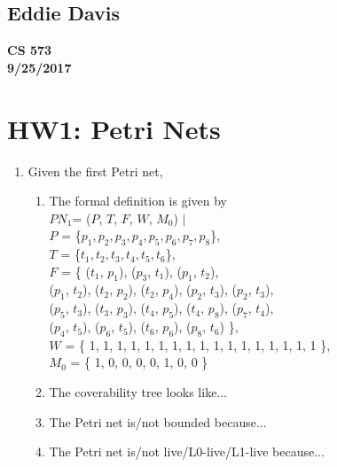 \documentclass{bsu-ms}
\begin{document}
\subsection*{Eddie Davis}
\textbf{CS 573}\\
\textbf{9/25/2017}\\

\section*{HW1: Petri Nets}

\begin{enumerate}
	\item Given the first Petri net,
	\begin{enumerate}[label=(\alph*)]
		\item The formal definition is given by \\
		$PN_1$= ($P$, $T$, $F$, $W$, $M_0$) $\mid$ \\
		$P$ = \{$p_1, p_2, p_3, p_4, p_5, p_6, p_7, p_8$\}, \\
		$T$ = \{$t_1, t_2, t_3, t_4, t_5, t_6$\}, \\
		$F$ = \{ ($t_1$, $p_1$), ($p_3$, $t_1$), ($p_1$, $t_2$), \\
		($p_1$, $t_2$), ($t_2$, $p_2$), ($t_2$, $p_4$),
		($p_2$, $t_3$), ($p_2$, $t_3$), \\
		($p_5$, $t_3$), ($t_3$, $p_3$), ($t_4$, $p_5$),
		($t_4$, $p_8$), ($p_7$, $t_4$), \\ ($p_4$, $t_5$),
		($p_6$, $t_5$), ($t_6$, $p_6$), ($p_8$, $t_6$)
		 \}, \\
   	    $W$ = \{ 1, 1, 1, 1, 1, 1, 1, 1, 1, 1, 1, 1, 1, 1, 1, 1, 1 \}, \\
        $M_0$ = \{ 1, 0, 0, 0, 0, 1, 0, 0 \}
		\item The coverability tree looks like...
		\item The Petri net is/not bounded because...
		\item The Petri net is/not live/L0-live/L1-live because...
	\end{enumerate}
	

\end{enumerate}
\end{document}
